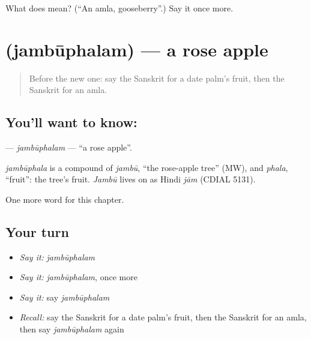 \begin{tcolorbox}[breakable,colback=teal!4,colframe=teal!35!black,title={Before you move on}]
What does  mean? (\textquotedblleft{}An amla, gooseberry\textquotedblright{}.) Say it once more.
\end{tcolorbox}
\section[\texorpdfstring{\sk{जम्बूफलम्} (jambūphalam)}{जम्बूफलम् (jambūphalam)}]{ (jambūphalam) — a rose apple}

\label{lesson:SA-C190-jambuphalam}



\begin{quote}
Before the new one: say the Sanskrit for a date palm's fruit, then the Sanskrit for an amla.
\end{quote}

\subsection*{You'll want to know: }
\textbf{} — \emph{jambūphalam} — \textquotedblleft{}a rose apple\textquotedblright{}.

\begin{cousinweb}
\emph{jambūphala} is a compound of \emph{jambū}, \textquotedblleft{}the rose-apple tree\textquotedblright{} (MW), and \emph{phala}, \textquotedblleft{}fruit\textquotedblright{}: the tree's fruit. \emph{Jambū} lives on as Hindi \emph{jām} (CDIAL 5131).
\end{cousinweb}

\begin{grammarlens}[title={What you've built}]
One more word for this chapter.
\end{grammarlens}

\subsection*{Your turn}
\begin{itemize}
\raggedright
  \item \emph{Say it:} \emph{jambūphalam}
  \item \emph{Say it:} \emph{jambūphalam}, once more
  \item \emph{Say it:} say \emph{jambūphalam}
  \item \emph{Recall:} say the Sanskrit for a date palm's fruit, then the Sanskrit for an amla, then say \emph{jambūphalam} again
\end{itemize}

